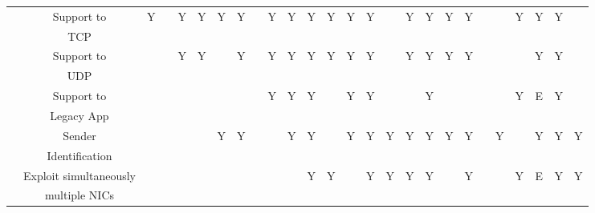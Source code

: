 \documentclass[preprint,12pt]{elsarticle}
\begin{document}
\begin{landscape}
\begin{table*}[t]
\begin{tabular}{|c|c|c|c|c|c|c|c|c|c|c|c|c|c|c|c|c|c|c|c|c|c|c|c|c|c|}
    & Support to & \multirow{2}{*}{Y} &  & \multirow{2}{*}{Y} & \multirow{2}{*}{Y} & 
	      \multirow{2}{*}{Y}	&
	      \multirow{2}{*}{Y} & & \multirow{2}{*}{Y} & \multirow{2}{*}{Y} & 
	      \multirow{2}{*}{Y} & \multirow{2}{*}{Y} & 
	      \multirow{2}{*}{Y} & 
	      \multirow{2}{*}{Y} & & \multirow{2}{*}{Y} & \multirow{2}{*}{Y} & \multirow{2}{*}{Y} 
	      & \multirow{2}{*}{Y} & & & \multirow{2}{*}{Y}  & \multirow{2}{*}{Y} & 
	      \multirow{2}{*}{Y} & \\
    & TCP  & & & & & & & & & & & & & & & & & & & & & & & & \\
  \hhline{~-------------------------}
    & Support to  & & & \multirow{2}{*}{Y} & \multirow{2}{*}{Y} & &
	      \multirow{2}{*}{Y} & & \multirow{2}{*}{Y} & \multirow{2}{*}{Y} & 
	      \multirow{2}{*}{Y} & \multirow{2}{*}{Y} & \multirow{2}{*}{Y} & 
	      \multirow{2}{*}{Y} & &  \multirow{2}{*}{Y} & \multirow{2}{*}{Y} &
	       \multirow{2}{*}{Y} & \multirow{2}{*}{Y} & & & & \multirow{2}{*}{Y} & 
	      \multirow{2}{*}{Y} & \\
    & UDP &  & & & & & & & & & & & & & & & & & &  & & & & &\\
  \hhline{~-------------------------}
    & Support to  & & & & & & & & \multirow{2}{*}{Y} & \multirow{2}{*}{Y} & 
	       \multirow{2}{*}{Y} & & \multirow{2}{*}{Y} & 
	      \multirow{2}{*}{Y} & & & \multirow{2}{*}{Y} & & & & & \multirow{2}{*}{Y} & \multirow{2}{*}{E} & 
	      \multirow{2}{*}{Y} & \\
    & Legacy App & & & & & & & & & & & & & & & & & & & & & & & & \\
  \hhline{~-------------------------}
    & Sender  & & & & & \multirow{2}{*}{Y} & \multirow{2}{*}{Y} & &  & \multirow{2}{*}{Y} & 
	      \multirow{2}{*}{Y} &  & \multirow{2}{*}{Y} & 
	      \multirow{2}{*}{Y} & \multirow{2}{*}{Y} &\multirow{2}{*}{Y} &\multirow{2}{*}{Y} &
	      \multirow{2}{*}{Y} &\multirow{2}{*}{Y} & & \multirow{2}{*}{Y} & & \multirow{2}{*}{Y} & 
	      \multirow{2}{*}{Y} & \multirow{2}{*}{Y} \\
    & Identification & & & & & & & & & & & & & & & & & & & & & & & &\\
  \hhline{~-------------------------}
    & Exploit simultaneously &  & & & & & & &  & &
	      \multirow{2}{*}{Y}  & \multirow{2}{*}{Y} & &
	      \multirow{2}{*}{Y} & \multirow{2}{*}{Y} & \multirow{2}{*}{Y} & \multirow{2}{*}{Y} & & \multirow{2}{*}{Y} & & & \multirow{2}{*}{Y} & \multirow{2}{*}{E} & 
	      \multirow{2}{*}{Y} & \multirow{2}{*}{Y} \\
    & multiple NICs & & & & &  & & & & & & & & & & & & & & & & & & &\\

\end{tabular}
\end{table*}
\end{landscape}
\end{document}
